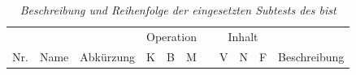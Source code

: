 \documentclass[11pt, twoside, a4paper]{book}		%
\begin{document}
\begin{table}
	\captionsetup{labelsep = none}
	\caption[Die Subtests des BIS-Test]{\newline  \textit{Beschreibung und Reihenfolge der eingesetzten Subtests des \gls{bist}} \vspace{.2cm}}
	\label{tab:BIS}
	\begin{adjustbox}{width=\textwidth,totalheight=.9\textheight,keepaspectratio}
		\begin{threeparttable}
			\begin{tabular}{l l c c c c p{.0001cm} c c c p{20cm}}
				\hline
					&		&		& \multicolumn{3}{c}{Operation}	&	&	\multicolumn{3}{c}{Inhalt}	&		\\
				\cline{4-6}
				\cline{8-10}
				\multicolumn{1}{c}{Nr.}	&	\multicolumn{1}{c}{Name}	&	\multicolumn{1}{c}{Abkürzung}	&		K	&	B	&	M		&	&		V	&	N	&	F		&	\multicolumn{1}{c}{Beschreibung}	\\
				

\end{tabular}
\end{threeparttable}
\end{adjustbox}
\end{table}
\end{document}
